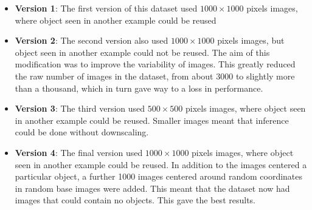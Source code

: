 \begin{itemize}
	\item \textbf{Version 1}: The first version of this dataset used $1000 \times 1000$ pixels images, where object seen in another example could be reused
	\item  \textbf{Version 2}: The second version also used $1000 \times 1000$ pixels images, but object seen in another example could not be reused. The aim of this modification was to improve the variability of images. This greatly reduced the raw number of images in the dataset, from about 3000 to slightly more than a thousand, which in turn gave way to a loss in performance.
	\item \textbf{Version 3}: The third version used $500 \times 500$ pixels images, where object seen in another example could be reused. Smaller images meant that inference could be done without downscaling. 
	\item  \textbf{Version 4}: The final version used $1000 \times 1000$ pixels images, where object seen in another example could be reused. In addition to the images centered a particular object, a further 1000 images centered around random coordinates in random base images were added. This meant that the dataset now had images that could contain no objects. This gave the best results. 
\end{itemize}


